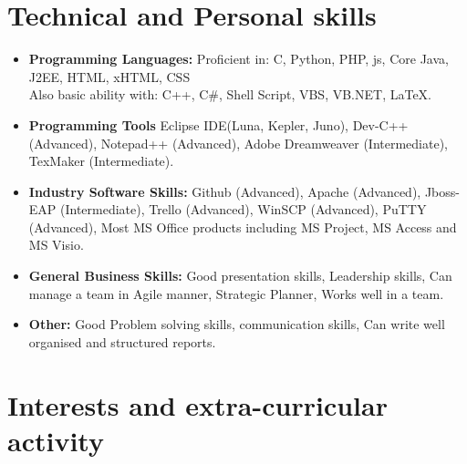 \documentclass[11pt,a4paper,sans]{moderncv}        %
\begin{document}
\section{Technical and Personal skills}

\vspace{8pt}

\begin{itemize}

\item \textbf{Programming Languages:} Proficient in: C, Python, PHP, js, Core Java, J2EE, HTML, xHTML, CSS \\ Also basic ability with: C++, C\#, Shell Script, VBS, VB.NET, LaTeX.

\vspace{8pt}

\item \textbf{Programming Tools} Eclipse IDE(Luna, Kepler, Juno), Dev-C++ (Advanced), Notepad++ (Advanced), Adobe Dreamweaver (Intermediate),  TexMaker (Intermediate).

\vspace{8pt}

\item \textbf{Industry Software Skills:} Github (Advanced), Apache (Advanced), Jboss-EAP (Intermediate), Trello (Advanced), WinSCP (Advanced), PuTTY (Advanced), Most MS Office products including MS Project, MS Access and MS Visio.

\vspace{8pt}

\item \textbf{General Business Skills:} Good presentation skills, Leadership skills, Can manage a team in Agile manner, Strategic Planner, Works well in a team.

\vspace{8pt}

\item \textbf{Other:} Good Problem solving skills, communication skills, Can write well organised and structured reports.

\end{itemize}

\section{Interests and extra-curricular activity}

\vspace{8pt}
\end{document}
